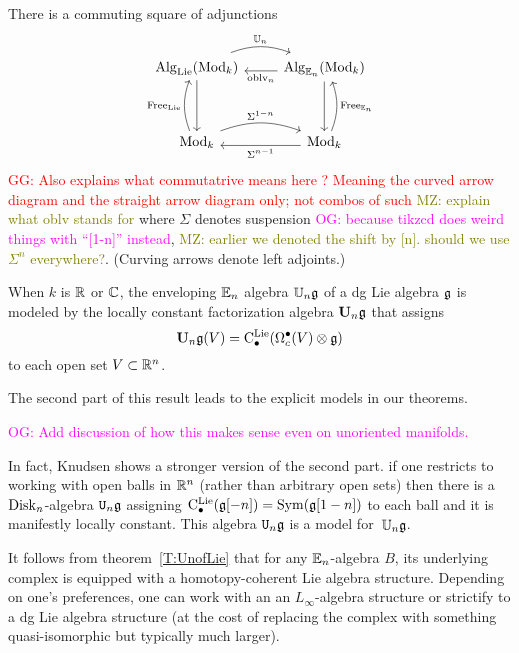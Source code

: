 \documentclass[11pt]{amsart}
\numberwithin{equation}{section}
\def\owen{\textcolor{magenta}{OG: }\textcolor{magenta}}
\def\mahmoud{\textcolor{olive}{MZ: }\textcolor{olive}}
\def\greg{\textcolor{red}{GG: }\textcolor{red}}
\begin{document}
\begin{thm}\label{T:UnofLie}
There is a commuting square of adjunctions
\[
\begin{tikzcd}
\Alg_\Lie(\Mod_k) \arrow[r, bend left=20, shift left=.5ex,"\UU_n"] \arrow[dd] & \Alg_{\EE_n}(\Mod_k) \arrow[l, shift left=.5ex, "\oblv_n"] \arrow[dd]\\
&\\
\Mod_k \arrow[r, bend left=20, shift left=.5ex, "\Sigma^{1-n}"] \arrow[uu, bend left=20, shift left=.5ex, "\Free_\Lie"] & \Mod_k \arrow[l, shift left=.5ex,"\Sigma^{n-1}"] \arrow[uu, bend right=20, shift right=.5ex, "\Free_{\EE_n}"']
\end{tikzcd}
\]
\greg{Also explains what commutatrive means here ? Meaning the curved arrow diagram and the straight arrow diagram only; not combos of such}
\mahmoud{explain what oblv stands for}
where $\Sigma$ denotes suspension \owen{because tikzcd does weird things with ``[1-n]'' instead}, \mahmoud{earlier we denoted the shift by [n]. should we use $\Sigma^n$ everywhere?}.
(Curving arrows denote left adjoints.)

When $k$ is $\mathbb R$ or $\mathbb C$, 
the enveloping $\mathbb E_n$ algebra $\mathbb U_n \mathfrak g$ of a dg Lie algebra $\mathfrak g$ is modeled by the locally constant factorization algebra $\mathbf U_n \mathfrak g$ that assigns
\[
\mathbf U_n \mathfrak g(V) = {\rm C}^{\rm Lie}_\bullet(\Omega^\bullet_c(V) \otimes \mathfrak g)
\]
to each open set $V \subset \mathbb R^n$.
\end{thm}

The second part of this result leads to the explicit models in our theorems.

\owen{Add discussion of how this makes sense even on unoriented manifolds.}

In fact, Knudsen shows a stronger version of the second part.
if one restricts to working with open balls in $\mathbb R^n$ (rather than arbitrary open sets)
then there is a ${\rm Disk}_n$-algebra ${\tt U}_n \mathfrak g$ assigning ${\rm C}^{\rm Lie}_\bullet(\mathfrak g[-n]) = {\rm Sym}(\mathfrak g[1-n])$ to each ball and it is manifestly locally constant.
This algebra ${\tt U}_n \mathfrak g$ is a model for~$\mathbb U_n \mathfrak g$.

\begin{rmk}
It follows from theorem~\ref{T:UnofLie} that for any $\mathbb E_n$-algebra $B$, 
its underlying complex is equipped with a homotopy-coherent Lie algebra structure.
Depending on one's preferences, one can work with an an $L_\infty$-algebra structure or strictify to a dg Lie algebra structure (at the cost of replacing the complex with something quasi-isomorphic but typically much larger).
\end{rmk}
\end{document}
